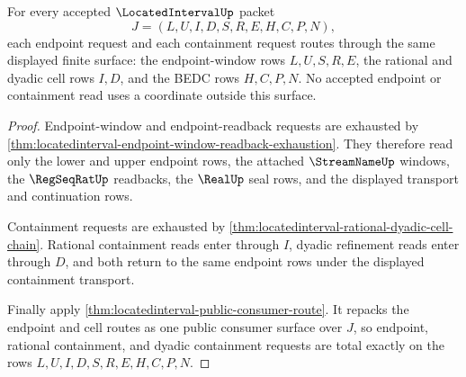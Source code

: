 \begin{theorem}
\label{thm:locatedinterval-endpoint-cell-route-totality}
For every accepted $\LocatedIntervalUp$ packet
$$
J=(L,U,I,D,S,R,E,H,C,P,N),
$$
each endpoint request and each containment request routes through the same displayed finite surface: the endpoint-window rows $L,U,S,R,E$, the rational and dyadic cell rows $I,D$, and the BEDC rows $H,C,P,N$. No accepted endpoint or containment read uses a coordinate outside this surface.
\end{theorem}
\begin{proof}
Endpoint-window and endpoint-readback requests are exhausted by \autoref{thm:locatedinterval-endpoint-window-readback-exhaustion}. They therefore read only the lower and upper endpoint rows, the attached $\StreamNameUp$ windows, the $\RegSeqRatUp$ readbacks, the $\RealUp$ seal rows, and the displayed transport and continuation rows.

Containment requests are exhausted by \autoref{thm:locatedinterval-rational-dyadic-cell-chain}. Rational containment reads enter through $I$, dyadic refinement reads enter through $D$, and both return to the same endpoint rows under the displayed containment transport.

Finally apply \autoref{thm:locatedinterval-public-consumer-route}. It repacks the endpoint and cell routes as one public consumer surface over $J$, so endpoint, rational containment, and dyadic containment requests are total exactly on the rows $L,U,I,D,S,R,E,H,C,P,N$.
\end{proof}

